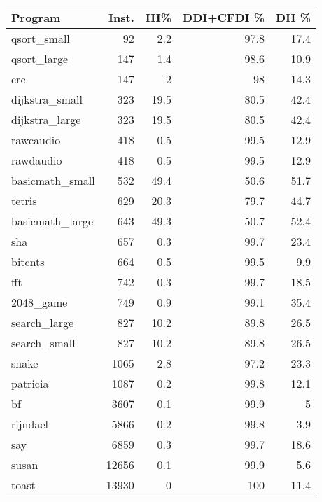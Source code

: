 \begin{tabular}{lrrr}
\hline
\end{tabular}\begin{tabular}{lrrrr}
\hline
 Program         &   Inst. &   III\% &   DDI+CFDI \% &   DII \% \\
\hline
 qsort\_small     &      92 &    2.2 &         97.8 &    17.4 \\
 qsort\_large     &     147 &    1.4 &         98.6 &    10.9 \\
 crc             &     147 &    2   &         98   &    14.3 \\
 dijkstra\_small  &     323 &   19.5 &         80.5 &    42.4 \\
 dijkstra\_large  &     323 &   19.5 &         80.5 &    42.4 \\
 rawcaudio       &     418 &    0.5 &         99.5 &    12.9 \\
 rawdaudio       &     418 &    0.5 &         99.5 &    12.9 \\
 basicmath\_small &     532 &   49.4 &         50.6 &    51.7 \\
 tetris          &     629 &   20.3 &         79.7 &    44.7 \\
 basicmath\_large &     643 &   49.3 &         50.7 &    52.4 \\
 sha             &     657 &    0.3 &         99.7 &    23.4 \\
 bitcnts         &     664 &    0.5 &         99.5 &     9.9 \\
 fft             &     742 &    0.3 &         99.7 &    18.5 \\
 2048\_game       &     749 &    0.9 &         99.1 &    35.4 \\
 search\_large    &     827 &   10.2 &         89.8 &    26.5 \\
 search\_small    &     827 &   10.2 &         89.8 &    26.5 \\
 snake           &    1065 &    2.8 &         97.2 &    23.3 \\
 patricia        &    1087 &    0.2 &         99.8 &    12.1 \\
 bf              &    3607 &    0.1 &         99.9 &     5   \\
 rijndael        &    5866 &    0.2 &         99.8 &     3.9 \\
 say             &    6859 &    0.3 &         99.7 &    18.6 \\
 susan           &   12656 &    0.1 &         99.9 &     5.6 \\
 toast           &   13930 &    0   &        100   &    11.4 \\

\end{tabular}
